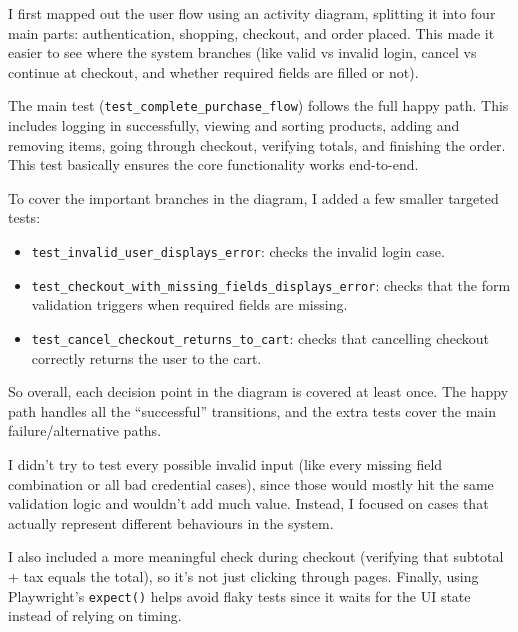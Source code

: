 I first mapped out the user flow using an activity diagram, splitting it 
into four main parts: authentication, shopping, checkout, and order placed. 
This made it easier to see where the system branches (like valid vs invalid 
login, cancel vs continue at checkout, and whether required fields are filled 
or not).

The main test (\texttt{test\_complete\_purchase\_flow}) follows the full happy 
path. This includes logging in successfully, viewing and sorting products, 
adding and removing items, going through checkout, verifying totals, and 
finishing the order. This test basically ensures the core functionality works 
end-to-end.

To cover the important branches in the diagram, I added a few smaller targeted 
tests:
\begin{itemize}
    \item \texttt{test\_invalid\_user\_displays\_error}: checks the invalid 
    login case.
    \item \texttt{test\_checkout\_with\_missing\_fields\_displays\_error}: 
    checks that the form validation triggers when required fields are missing.
    \item \texttt{test\_cancel\_checkout\_returns\_to\_cart}: checks that 
    cancelling checkout correctly returns the user to the cart.
\end{itemize}

So overall, each decision point in the diagram is covered at least once. The 
happy path handles all the “successful” transitions, and the extra tests cover 
the main failure/alternative paths.

I didn't try to test every possible invalid input (like every missing field 
combination or all bad credential cases), since those would mostly hit the same 
validation logic and wouldn't add much value. Instead, I focused on cases that 
actually represent different behaviours in the system.

I also included a more meaningful check during checkout (verifying that 
subtotal + tax equals the total), so it's not just clicking through pages. 
Finally, using Playwright's \texttt{expect()} helps avoid flaky tests since 
it waits for the UI state instead of relying on timing.


